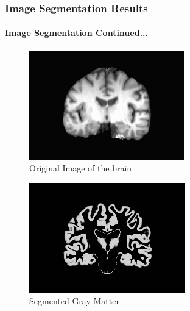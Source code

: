 \documentclass{beamer}
\begin{document}
  \begin{frame}[t]
    \frametitle{Image Segmentation Results}
    \framesubtitle{Image Segmentation Continued...}

    \vskip 10pt

    \begin{figure}[H]
      \centering
      \includegraphics[width=0.6\textwidth]{./.img/original.jpg}
      \caption{Original Image of the brain}
    \end{figure}
  \end{frame}

  \begin{frame}

    \vskip 20pt

    \begin{figure}[H]
      \centering
      \includegraphics[width=0.6\linewidth]{./.img/grey-matter.jpg}
      \caption{Segmented Gray Matter}%
      \label{fig:./.img/grey-matter}
    \end{figure}

  \end{frame}
\end{document}
